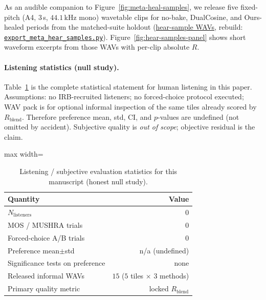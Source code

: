 As an audible companion to Figure~\ref{fig:meta-heal-samples}, we release five fixed-pitch (A4, $3$\,s, $44.1$\,kHz mono) wavetable clips for no-bake, DualCosine, and Ours-healed periods from the matched-suite holdout
(\href{https://github.com/reeldemo/reelsynth/tree/main/brand/artifacts/meta_approach_compare/hear_samples}{hear-sample WAVs},
rebuild:
\href{https://github.com/reeldemo/reelsynth/blob/main/scripts/export_meta_hear_samples.py}{\texttt{export\_meta\_hear\_samples.py}}).
Figure~\ref{fig:hear-samples-panel} shows short waveform excerpts from those WAVs with per-clip absolute $R$.

\paragraph{Listening statistics (null study).}
Table~\ref{tab:listening-stats} is the complete statistical statement for human listening in this paper.
Assumptions: no IRB-recruited listeners; no forced-choice protocol executed; WAV pack is for optional informal inspection of the same tiles already scored by $R_{\mathrm{blend}}$.
Therefore preference mean, std, CI, and $p$-values are undefined (not omitted by accident).
Subjective quality is \emph{out of scope}; objective residual is the claim.

\begin{table}[t]
  \centering
  \caption{Listening / subjective evaluation statistics for this manuscript (honest null study).}
  \label{tab:listening-stats}
  \setlength{\tabcolsep}{6pt}
  \begin{adjustbox}{max width=\columnwidth}
\begin{tabular}{@{}lr@{}}
    \toprule
    Quantity & Value \\
    \midrule
    $N_{\mathrm{listeners}}$ & $0$ \\
    MOS / MUSHRA trials & $0$ \\
    Forced-choice A/B trials & $0$ \\
    Preference mean$\pm$std & n/a (undefined) \\
    Significance tests on preference & none \\
    Released informal WAVs & $15$ ($5$ tiles $\times$ $3$ methods) \\
    Primary quality metric & locked $R_{\mathrm{blend}}$ \\
    \bottomrule
  \end{tabular}
\end{adjustbox}
\end{table}

